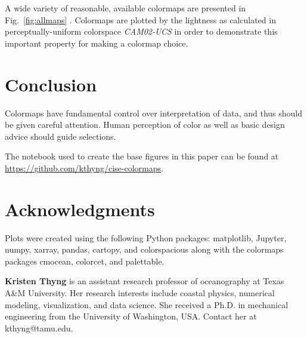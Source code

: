 \documentclass[10pt,journal,compsoc]{IEEEtran}
\begin{document}
A wide variety of reasonable, available colormaps are presented in Fig.~\ref{fig:allmaps} \citep{hunter2007matplotlib,light2004end,brewer,crameri2018geodynamic,mycarta}. Colormaps are plotted by the lightness as calculated in perceptually-uniform colorspace \textit{CAM02-UCS} in order to demonstrate this important property for making a colormap choice.




\section{Conclusion}

Colormaps have fundamental control over interpretation of data, and thus should be given careful attention. Human perception of color as well as basic design advice should guide selections.

The notebook used to create the base figures in this paper can be found at \url{https://github.com/kthyng/cise-colormaps}.


\section{Acknowledgments}

Plots were created using the following Python packages: matplotlib, Jupyter, numpy, xarray, pandas, cartopy, and colorspacious along with the colormaps packages cmocean, colorcet, and palettable.






\bigskip

\textbf{Kristen Thyng} is an assistant research professor of oceanography at Texas A\&M University. Her research interests include coastal physics, numerical modeling, visualization, and data science. She received a Ph.D. in mechanical engineering from the University of Washington, USA. Contact her at kthyng@tamu.edu.
\end{document}
